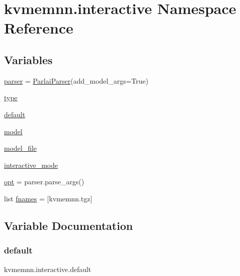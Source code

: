 \hypertarget{namespacekvmemnn_1_1interactive}{}\section{kvmemnn.\+interactive Namespace Reference}
\label{namespacekvmemnn_1_1interactive}
\subsection*{Variables}
\begin{DoxyCompactItemize}
\item 
\hyperlink{namespacekvmemnn_1_1interactive_a41ec9f716f2080d80444749f7b969728}{parser} = \hyperlink{classparlai_1_1core_1_1params_1_1ParlaiParser}{Parlai\+Parser}(add\+\_\+model\+\_\+args=True)
\item 
\hyperlink{namespacekvmemnn_1_1interactive_a1698554012c0b91bef3ece564e11f393}{type}
\item 
\hyperlink{namespacekvmemnn_1_1interactive_a44460dfb8b38df44b326bed453a8863b}{default}
\item 
\hyperlink{namespacekvmemnn_1_1interactive_aa1e0ba6e8a4242599950851699ed6f95}{model}
\item 
\hyperlink{namespacekvmemnn_1_1interactive_a66c8086201de36060b4e32ca65c31a9c}{model\+\_\+file}
\item 
\hyperlink{namespacekvmemnn_1_1interactive_a07ca830b1f38e5179e3b0d40fb16eec3}{interactive\+\_\+mode}
\item 
\hyperlink{namespacekvmemnn_1_1interactive_a70f6d84eb79dac9243d23588351c6351}{opt} = parser.\+parse\+\_\+args()
\item 
list \hyperlink{namespacekvmemnn_1_1interactive_a5a538158b4f8de1b7f6eccfbda4a2b07}{fnames} = \mbox{[}\textquotesingle{}kvmemnn.\+tgz\textquotesingle{}\mbox{]}
\end{DoxyCompactItemize}


\subsection{Variable Documentation}
\mbox{\label{namespacekvmemnn_1_1interactive_a44460dfb8b38df44b326bed453a8863b}} 
\subsubsection{\texorpdfstring{default}{default}}
{\footnotesize\ttfamily kvmemnn.\+interactive.\+default}

